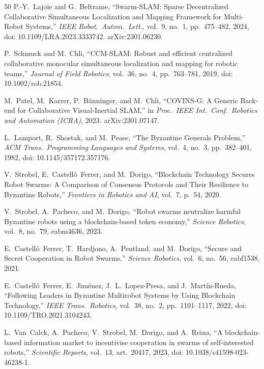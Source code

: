 \documentclass[conference,10pt]{IEEEtran}
\begin{document}
\begin{thebibliography}{50}
P.-Y.~Lajoie and G.~Beltrame,
``Swarm-SLAM: Sparse Decentralized Collaborative Simultaneous Localization and Mapping Framework for Multi-Robot Systems,''
\emph{IEEE Robot.\ Autom.\ Lett.}, vol.~9, no.~1, pp.~475--482, 2024,
doi: 10.1109/LRA.2023.3333742. arXiv:2301.06230.

P.~Schmuck and M.~Chli,
``{CCM-SLAM}: Robust and efficient centralized collaborative monocular simultaneous localization and mapping for robotic teams,''
\emph{Journal of Field Robotics}, vol.~36, no.~4, pp.~763--781, 2019,
doi: 10.1002/rob.21854.

M.~Patel, M.~Karrer, P.~Bänninger, and M.~Chli,
``COVINS-G: A Generic Back-end for Collaborative Visual-Inertial SLAM,''
in \emph{Proc.\ IEEE Int.\ Conf.\ Robotics and Automation (ICRA)}, 2023. arXiv:2301.07147.

L.~Lamport, R.~Shostak, and M.~Pease,
``The Byzantine Generals Problem,''
\emph{ACM Trans.\ Programming Languages and Systems}, vol.~4, no.~3, pp.~382--401, 1982,
doi: 10.1145/357172.357176.

V.~Strobel, E.~Castelló~Ferrer, and M.~Dorigo,
``Blockchain Technology Secures Robot Swarms: A Comparison of Consensus Protocols and Their Resilience to Byzantine Robots,''
\emph{Frontiers in Robotics and AI}, vol.~7, p.~54, 2020.

V.~Strobel, A.~Pacheco, and M.~Dorigo,
``Robot swarms neutralize harmful Byzantine robots using a blockchain-based token economy,''
\emph{Science Robotics}, vol.~8, no.~79, eabm4636, 2023.

E.~Castelló~Ferrer, T.~Hardjono, A.~Pentland, and M.~Dorigo,
``Secure and Secret Cooperation in Robot Swarms,''
\emph{Science Robotics}, vol.~6, no.~56, eabf1538, 2021.

E.~Castelló~Ferrer, E.~Jiménez, J.~L.~Lopez-Presa, and J.~Martín-Rueda,
``Following Leaders in Byzantine Multirobot Systems by Using Blockchain Technology,''
\emph{IEEE Trans.\ Robotics}, vol.~38, no.~2, pp.~1101--1117, 2022,
doi: 10.1109/TRO.2021.3104243.

L.~Van~Calck, A.~Pacheco, V.~Strobel, M.~Dorigo, and A.~Reina,
``A blockchain-based information market to incentivise cooperation in swarms of self-interested robots,''
\emph{Scientific Reports}, vol.~13, art.~20417, 2023,
doi: 10.1038/s41598-023-46238-1.


\end{thebibliography}
\end{document}
